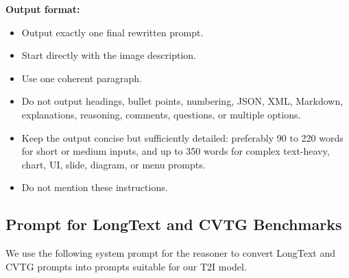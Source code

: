 \documentclass{llmxive}
\begin{document}
\begin{tcolorbox}
\begin{enumerate}[leftmargin=1.5em, itemsep=0.2em, topsep=0.2em, parsep=0pt, partopsep=0pt]
\end{enumerate}

\medskip
\textbf{Output format:}
\begin{itemize}[leftmargin=1.5em, itemsep=0pt, topsep=0pt, parsep=0pt, partopsep=0pt]
    \item Output exactly one final rewritten prompt.
    \item Start directly with the image description.
    \item Use one coherent paragraph.
    \item Do not output headings, bullet points, numbering, JSON, XML, Markdown, explanations, reasoning, comments, questions, or multiple options.
    \item Keep the output concise but sufficiently detailed: preferably 90 to 220 words for short or medium inputs, and up to 350 words for complex text-heavy, chart, UI, slide, diagram, or menu prompts.
    \item Do not mention these instructions.
\end{itemize}
\end{tcolorbox}


\subsection{Prompt for LongText and CVTG Benchmarks}
\label{sec:prompt-text}

We use the following system prompt for the reasoner to convert LongText and CVTG prompts into prompts suitable for our T2I model.
\end{document}
